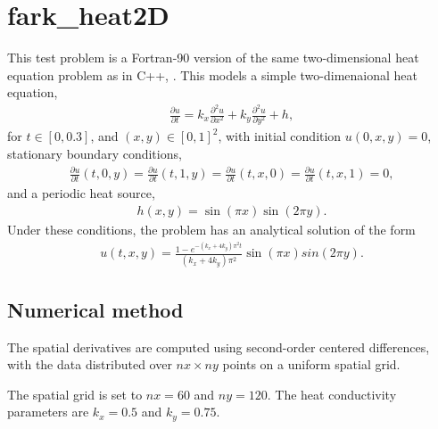 \documentclass[letterpaper,10pt,english]{sphinxmanual}
\begin{document}
\section{fark\_heat2D}
\label{\detokenize{f90_parallel:fark-heat2d}}\label{\detokenize{f90_parallel:id1}}
This test problem is a Fortran-90 version of the same two-dimensional
heat equation problem as in C++, {\hyperref[\detokenize{cpp_parallel:ark-heat2d}]{}}.  This models a
simple two-dimenaional heat equation,
\begin{equation*}
\begin{split}\frac{\partial u}{\partial t} = k_x \frac{\partial^2 u}{\partial x^2}
                              + k_y \frac{\partial^2 u}{\partial y^2} + h,\end{split}
\end{equation*}
for \(t \in [0, 0.3]\), and \((x,y) \in [0, 1]^2\), with initial
condition \(u(0,x,y) = 0\), stationary boundary conditions,
\begin{equation*}
\begin{split}\frac{\partial u}{\partial t}(t,0,y) = \frac{\partial u}{\partial t}(t,1,y) =
\frac{\partial u}{\partial t}(t,x,0) = \frac{\partial u}{\partial t}(t,x,1) = 0,\end{split}
\end{equation*}
and a periodic heat source,
\begin{equation*}
\begin{split}h(x,y) = \sin(\pi x) \sin(2\pi y).\end{split}
\end{equation*}
Under these conditions, the problem has an analytical solution of the
form
\begin{equation*}
\begin{split}u(t,x,y) = \frac{1 - e^{-(k_x+4k_y)\pi^2 t}}{(k_x+4k_y)\pi^2} \sin(\pi x) sin(2\pi y).\end{split}
\end{equation*}

\subsection{Numerical method}
\label{\detokenize{f90_parallel:numerical-method}}
The spatial derivatives are computed using second-order centered
differences, with the data distributed over \(nx\times ny\) points
on a uniform spatial grid.

The spatial grid is set to \(nx=60\) and \(ny=120\).  The heat
conductivity parameters are \(k_x=0.5\) and \(k_y=0.75\).
\end{document}
